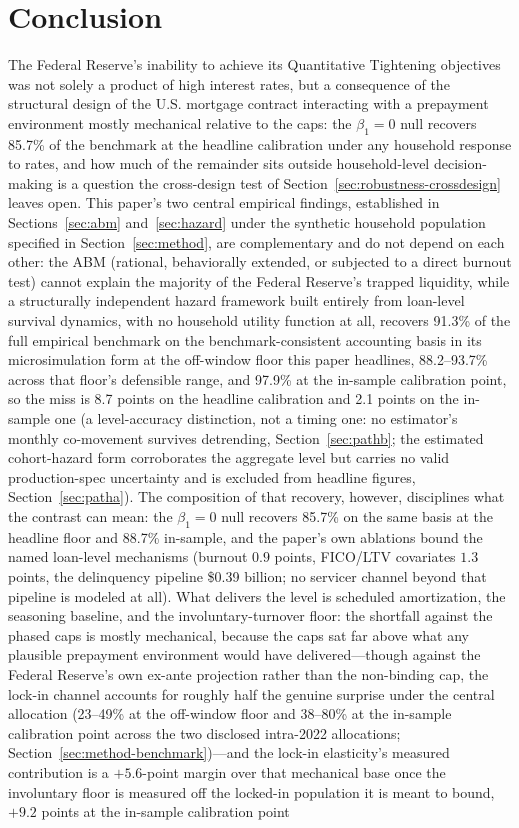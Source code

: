 \documentclass[12pt]{article}
\begin{document}
\section{Conclusion}\label{sec:conclusion}

The Federal Reserve's inability to achieve its Quantitative Tightening objectives was not solely a product of high interest rates, but a consequence of the structural design of the U.S. mortgage contract interacting with a prepayment environment mostly mechanical relative to the caps: the $\beta_1 = 0$ null recovers 85.7\% of the benchmark at the headline calibration under any household response to rates, and how much of the remainder sits outside household-level decision-making is a question the cross-design test of Section~\ref{sec:robustness-crossdesign} leaves open. This paper's two central empirical findings, established in Sections~\ref{sec:abm} and~\ref{sec:hazard} under the synthetic household population specified in Section~\ref{sec:method}, are complementary and do not depend on each other: the ABM (rational, behaviorally extended, or subjected to a direct burnout test) cannot explain the majority of the Federal Reserve's trapped liquidity, while a structurally independent hazard framework built entirely from loan-level survival dynamics, with no household utility function at all, recovers 91.3\% of the full empirical benchmark on the benchmark-consistent accounting basis in its microsimulation form at the off-window floor this paper headlines, 88.2--93.7\% across that floor's defensible range, and 97.9\% at the in-sample calibration point, so the miss is 8.7 points on the headline calibration and 2.1 points on the in-sample one (a level-accuracy distinction, not a timing one: no estimator's monthly co-movement survives detrending, Section~\ref{sec:pathb}; the estimated cohort-hazard form corroborates the aggregate level but carries no valid production-spec uncertainty and is excluded from headline figures, Section~\ref{sec:patha}). The composition of that recovery, however, disciplines what the contrast can mean: the $\beta_1 = 0$ null recovers 85.7\% on the same basis at the headline floor and 88.7\% in-sample, and the paper's own ablations bound the named loan-level mechanisms (burnout $0.9$ points, FICO/LTV covariates $1.3$ points, the delinquency pipeline \$0.39 billion; no servicer channel beyond that pipeline is modeled at all). What delivers the level is scheduled amortization, the seasoning baseline, and the involuntary-turnover floor: the shortfall against the phased caps is mostly mechanical, because the caps sat far above what any plausible prepayment environment would have delivered---though against the Federal Reserve's own ex-ante projection rather than the non-binding cap, the lock-in channel accounts for roughly half the genuine surprise under the central allocation (23--49\% at the off-window floor and 38--80\% at the in-sample calibration point across the two disclosed intra-2022 allocations; Section~\ref{sec:method-benchmark})---and the lock-in elasticity's measured contribution is a $+5.6$-point margin over that mechanical base once the involuntary floor is measured off the locked-in population it is meant to bound, $+9.2$ points at the in-sample calibration point 
\end{document}
